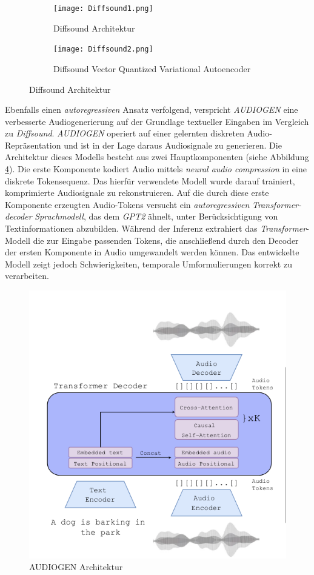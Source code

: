 \documentclass[
  a4paper,  %
  twoside,  %
  bibliography=totoc,
  headsepline,
  cleardoublepage=empty,
  parskip=half,
  draft=false
]{scrbook}
\begin{document}
\begin{figure}[h]
\centering
\begin{subfigure}{1.0\textwidth}
  \centering
  \texttt{[image: Diffsound1.png]}
  \caption[Diffsound Architektur]{Diffsound Architektur}
  \label{fig:DiffsoundArchitecture}
\end{subfigure}

\vspace{1em} %

\begin{subfigure}{1.0\textwidth}
  \centering
  \texttt{[image: Diffsound2.png]}
  \caption[Diffsound VQ-VAE]{Diffsound Vector Quantized Variational Autoencoder}
  \label{fig:VQVAE}
\end{subfigure}
\caption[Diffsound Architektur]{Diffsound Architektur \cite{yang_diffsound_2023}}
\label{fig:test}
\end{figure}

Ebenfalls einen \emph{autoregressiven} Ansatz verfolgend, verspricht \emph{AUDIOGEN}\cite{kreuk_audiogen_2023} eine verbesserte Audiogenerierung auf der Grundlage textueller Eingaben im Vergleich zu \emph{Diffsound}. \emph{AUDIOGEN} operiert auf einer gelernten diskreten Audio-Repräsentation und ist in der Lage daraus Audiosignale zu generieren. Die Architektur dieses Modells besteht aus zwei Hauptkomponenten (siehe Abbildung \ref{fig:audiogen}). Die erste Komponente kodiert Audio mittels \emph{neural audio compression}\cite{zeghidour_soundstream_2021} in eine diskrete Tokensequenz. Das hierfür verwendete Modell wurde darauf trainiert, komprimierte Audiosignale zu rekonstruieren. Auf die durch diese erste Komponente erzeugten Audio-Tokens versucht ein \emph{autoregressiven} \emph{Transformer-decoder} \emph{Sprachmodell}, das dem \emph{GPT2} \cite{alec_radford_jeff_wu_rewon_child_david_luan_dario_amodei_ilya_sutskever_language_2019} ähnelt, unter Berücksichtigung von Textinformationen abzubilden. Während der Inferenz extrahiert das \emph{Transformer}-Modell die zur Eingabe passenden Tokens, die anschließend durch den Decoder der ersten Komponente in Audio umgewandelt werden können. Das entwickelte Modell zeigt jedoch Schwierigkeiten, temporale Umformulierungen korrekt zu verarbeiten. \cite{kreuk_audiogen_2023}

\begin{figure}[h]
  \centering
  \includegraphics[width=.5\textwidth]{graphics/Audiogen.png}
  \caption[AUDIOGEN Architektur]{AUDIOGEN Architektur \cite{kreuk_audiogen_2023}}
  \label{fig:audiogen}
\end{figure}
\end{document}
